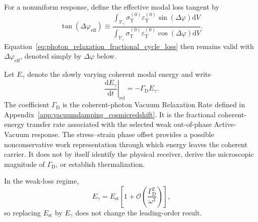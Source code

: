 For a nonuniform response, define the effective modal loss tangent by
\begin{equation}
    \tan
    \left(
        \Delta\varphi_{\mathrm{eff}}
    \right)
    \equiv
    \frac{
        \displaystyle
        \int_{\mathcal{V}_{\gamma}}
        \sigma_{\mathrm T}^{(0)}
        \varepsilon_{\mathrm T}^{(0)}
        \sin
        \left(
            \Delta\varphi
        \right)
        \mathrm{d}V
    }{
        \displaystyle
        \int_{\mathcal{V}_{\gamma}}
        \sigma_{\mathrm T}^{(0)}
        \varepsilon_{\mathrm T}^{(0)}
        \cos
        \left(
            \Delta\varphi
        \right)
        \mathrm{d}V
    }.
    \label{eq:photon_relaxation_effective_loss_tangent}
\end{equation}
Equation~\eqref{eq:photon_relaxation_fractional_cycle_loss} then remains
valid with \(\Delta\varphi_{\mathrm{eff}}\), denoted simply by
\(\Delta\varphi\) below.

Let \(E_\gamma\) denote the slowly varying coherent modal energy and write
\begin{equation}
    \left.
    \frac{
        \mathrm{d}E_\gamma
    }{
        \mathrm{d}t
    }
    \right|_{\mathrm{rel}}
    =
    -\Gamma_{\mathrm D}E_\gamma.
    \label{eq:photon_relaxation_energy_decay_reintroduced}
\end{equation}
The coefficient \(\Gamma_{\mathrm D}\) is the coherent-photon Vacuum
Relaxation Rate defined in
Appendix~\ref{app:vacuumdamping_cosmicredshift}. It is the fractional
coherent-energy transfer rate associated with the selected weak
out-of-phase Active-Vacuum response. The stress--strain phase offset provides
a possible nonconservative work representation through which energy leaves
the coherent carrier. It does not by itself identify the physical receiver,
derive the microscopic magnitude of \(\Gamma_{\mathrm D}\), or establish
thermalization.

In the weak-loss regime,
\begin{equation}
    E_\gamma
    =
    E_{\mathrm{st}}
    \left[
        1
        +
        \mathcal{O}
        \left(
            \frac{
                \Gamma_{\mathrm D}^{2}
            }{
                \omega^{2}
            }
        \right)
    \right],
    \label{eq:photon_relaxation_total_stored_energy_relation}
\end{equation}
so replacing \(E_{\mathrm{st}}\) by \(E_\gamma\) does not change the
leading-order result.

